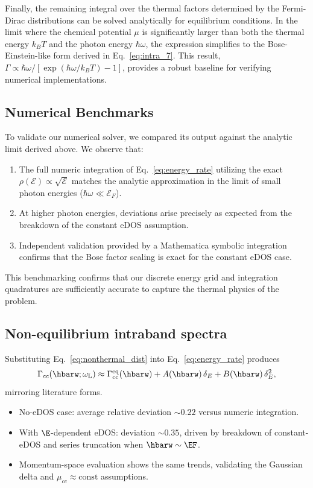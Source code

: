 Finally, the remaining integral over the thermal factors determined by the Fermi-Dirac distributions can be solved analytically for equilibrium conditions. In the limit where the chemical potential $\mu$ is significantly larger than both the thermal energy $k_B T$ and the photon energy $\hbar\omega$, the expression simplifies to the Bose-Einstein-like form derived in Eq.~\ref{eq:intra_7}. This result, $\Gamma \propto \hbar\omega / [\exp(\hbar\omega/k_B T) - 1]$, provides a robust baseline for verifying numerical implementations.

\subsection{Numerical Benchmarks}
To validate our numerical solver, we compared its output against the analytic limit derived above. We observe that:
\begin{enumerate}
    \item The full numeric integration of Eq.~\ref{eq:energy_rate} utilizing the exact $\rho(\mathcal{E}) \propto \sqrt{\mathcal{E}}$ matches the analytic approximation in the limit of small photon energies ($\hbar\omega \ll \mathcal{E}_F$).
    \item At higher photon energies, deviations arise precisely as expected from the breakdown of the constant eDOS assumption.
    \item Independent validation provided by a Mathematica symbolic integration confirms that the Bose factor scaling is exact for the constant eDOS case.
\end{enumerate}
This benchmarking confirms that our discrete energy grid and integration quadratures are sufficiently accurate to capture the thermal physics of the problem.

\subsection{Non-equilibrium intraband spectra}
Substituting Eq.~\eqref{eq:nonthermal_dist} into Eq.~\eqref{eq:energy_rate} produces
\begin{equation}
  \Gamma_{cc}(\hbarw;\omega_{\mathrm{L}})\approx \Gamma^{\mathrm{eq}}_{cc}(\hbarw)+A(\hbarw)\,\delta_{E}+B(\hbarw)\,\delta_{E}^{2},
  \label{eq:nonthermal_series}
\end{equation}
mirroring literature forms.
\begin{itemize}
  \item No-eDOS case: average relative deviation $\sim 0.22$ versus numeric integration.
  \item With $\E$-dependent eDOS: deviation $\sim 0.35$, driven by breakdown of constant-eDOS and series truncation when $\hbarw\sim\EF$.
  \item Momentum-space evaluation shows the same trends, validating the Gaussian delta and $\mu_{cc}\approx\mathrm{const}$ assumptions.
\end{itemize}
